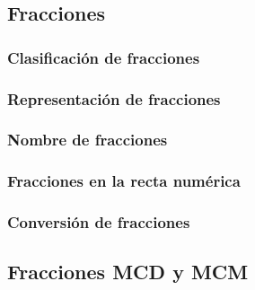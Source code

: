 \documentclass[12pt,addpoints]{evalua3}
\begin{document}
\begin{questions}
{
	}


	\subsection   {Fracciones}
	\subsubsection{Clasificación de fracciones}
	\question{}
	\subsubsection{Representación de fracciones}
	\question{}
	\subsubsection{Nombre de fracciones}
	\question{}
	\subsubsection{Fracciones en la recta numérica}
	\question{}
	\subsubsection{Conversión de fracciones}
	\question{}

	\subsection   {Fracciones MCD y MCM}

\end{questions}
\end{document}

